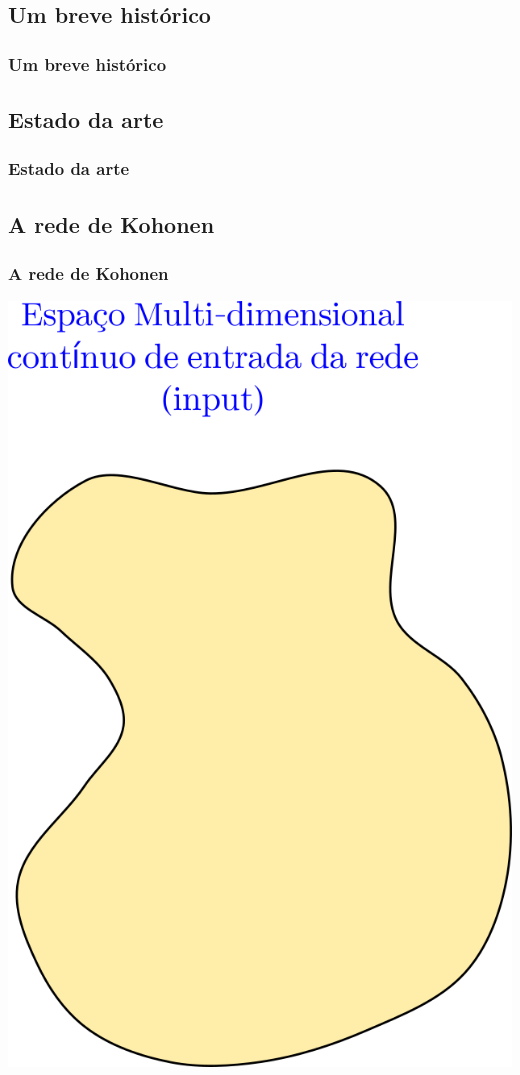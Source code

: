 \documentclass[10pt]{beamer} %
\begin{document}
\subsection{Um breve histórico}

\begin{frame}
	\frametitle{Um breve histórico}
\end{frame}

\subsection{Estado da arte}

\begin{frame}
	\frametitle{Estado da arte}
\end{frame}

\subsection{A rede de Kohonen}

\begin{frame}
	\frametitle{A rede de Kohonen}
	\includegraphics[scale=0.5]{Imagens/IntroKoho1.png} 
	
\end{frame}
\end{document}
